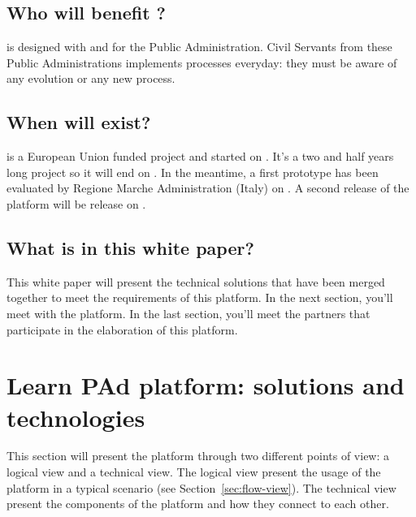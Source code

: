 \documentclass{learnpad}
\begin{document}
\section{Who will benefit \learnpad?}
\learnpad is designed with and for the Public Administration.  Civil Servants
from these Public Administrations implements processes everyday: they must be
aware of any evolution or any new process.

\section{When will \learnpad exist?}
\learnpad is a European Union funded project and started on
\origdate{}.  It's a two and half years long project so it
will end on .  In the meantime, a first prototype has been
evaluated by Regione Marche Administration (Italy) on .  A
second release of the platform will be release on .

\section{What is in this white paper?}
This white paper will present the technical solutions that have been merged
together to meet the requirements of this \learnpad platform.  In the next
section, you'll meet with the \learnpad platform.  In the last section, you'll
meet the partners that participate in the elaboration of this \learnpad
platform.

\chapter{Learn PAd platform: solutions and technologies}
\label{ch:platform}
This section will present the \learnpad platform through two different points of
view: a logical view and a technical view.  The logical view present the usage
of the platform in a typical scenario (see Section~\ref{sec:flow-view}).  The
technical view present the components of the  platform and how they connect to
each other.
\end{document}
